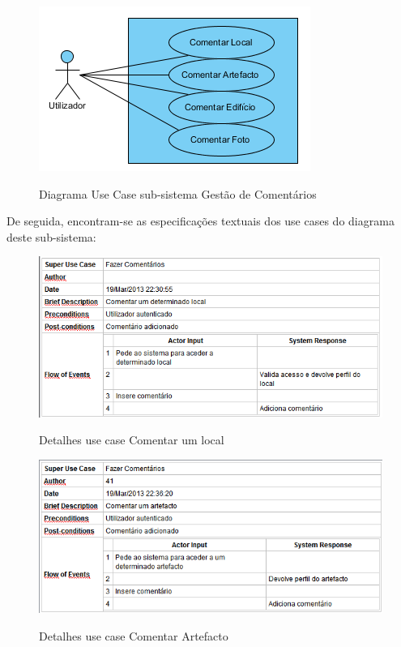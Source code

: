 ﻿\documentclass[12pt,a4paper]{article}
\begin{document}
\begin{figure}[h!]
\centering
\includegraphics[scale=1]{usecase/U_FazerComentarios}
\label{usecase}
\caption{Diagrama Use Case sub-sistema Gestão de Comentários}
\end{figure}

De seguida, encontram-se as especificações textuais dos use cases do diagrama deste sub-sistema:\\

\begin{figure}[h!]
\centering
\includegraphics[scale=0.7]{d_usecase/comentarlocal}
\label{usecase}
\caption{Detalhes use case Comentar um local}
\end{figure}

\begin{figure}[h!]
\centering
\includegraphics[scale=0.7]{d_usecase/comentarartefacto}
\label{usecase}
\caption{Detalhes use case Comentar Artefacto}
\end{figure}
\end{document}
